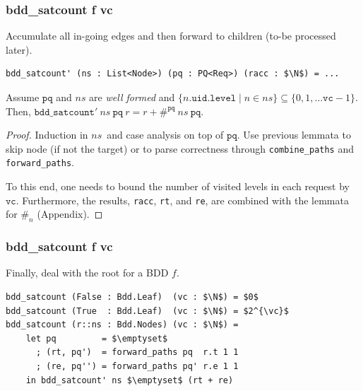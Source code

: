 \documentclass[english, aspectratio=169]{beamer}
\newcommand{\ns}[0]{\ensuremath{\mathit{ns}}}
\newcommand{\pq}[0]{\ensuremath{\texttt{pq}}}
\newcommand{\vc}[0]{\ensuremath{\texttt{vc}}}
\newcommand{\countPQ}[0]{\ensuremath{\#^{\pq}}}
\begin{document}
\begin{frame} %
  \frametitle{bdd\_satcount f vc}

  Accumulate all in-going edges and then forward to children (to-be processed later).
  \begin{lstlisting}
bdd_satcount' (ns : List<Node>) (pq : PQ<Req>) (racc : $\N$) = ...
  \end{lstlisting}

  \begin{lemma}
    Assume $\pq$ and $\ns$ are \emph{well formed} and
    $\{ n.\texttt{uid}.\texttt{level} \mid n \in \ns \} \subseteq \{ 0, 1, \dots \vc-1 \}$. Then,
    $\texttt{bdd\_satcount}'\ \ns\ \pq\ r = r + \countPQ\ \ns\ \pq$.
  \end{lemma}
  \begin{proof}
    \small

    Induction in \ns\ and case analysis on top of \pq. Use previous lemmata to skip node (if not the
    target) or to parse correctness through \texttt{combine\_paths} and \texttt{forward\_paths}.

    To this end, one needs to bound the number of visited levels in each request by \vc.
    Furthermore, the results, \texttt{racc}, \texttt{rt}, and \texttt{re}, are combined with the lemmata
    for $\#_n$ (Appendix).
  \end{proof}
\end{frame}


\begin{frame}[t, fragile]
  \frametitle{bdd\_satcount f vc}

  Finally, deal with the root for a BDD $f$.

  \begin{lstlisting}
bdd_satcount (False : Bdd.Leaf)  (vc : $\N$) = $0$
bdd_satcount (True  : Bdd.Leaf)  (vc : $\N$) = $2^{\vc}$
bdd_satcount (r::ns : Bdd.Nodes) (vc : $\N$) =
    let pq         = $\emptyset$
      ; (rt, pq')  = forward_paths pq  r.t 1 1
      ; (re, pq'') = forward_paths pq' r.e 1 1
    in bdd_satcount' ns $\emptyset$ (rt + re)
  \end{lstlisting}
\end{frame}
\end{document}
